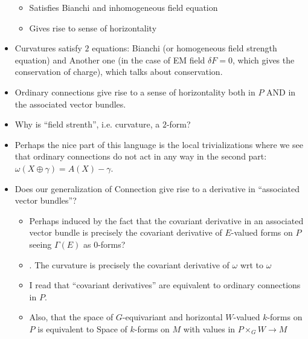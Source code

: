 \begin{itemize}
\begin{itemize}
        \item Satisfies Bianchi and inhomogeneous field equation
        
        \item Gives rise to sense of horizontality
    \end{itemize}
    
    \item Curvatures satisfy $2$ equations: Bianchi (or homogeneous field strength equation) and Another one (in the case of EM field $\delta F = 0$, which gives the conservation of charge), which talks about conservation. \label{BianchiandInhomogeneous}
    
    \item Ordinary connections give rise to a sense of horizontality both in $P$ AND in the associated vector bundles. \label{ordinaryHorizontality}
    
    \item Why is ``field strenth'', i.e. curvature, a $2$-form?
    
    
    
    \item Perhaps the nice part of this language is the local trivializations where we see that ordinary connections do not act in any way in the second part: $\omega(X \oplus \gamma) = A(X) - \gamma$.
    
    
    
    \item Does our generalization of Connection give rise to a  derivative in ``associated vector bundles''? \label{trulyCovariant}
    \begin{itemize}
        \item Perhaps induced by the fact that the covariant derivative in an associated vector bundle is precisely the covariant derivative of $E$-valued forms on $P$ seeing $\Gamma(E)$ as $0$-forms?
        
        \item {}. The curvature is precisely the covariant derivative of $\omega$ wrt to $\omega$
        
        \item I read that ``covariant derivatives'' are equivalent to ordinary connections in $P$.
        
        \item Also, that the space of $G$-equivariant and horizontal $W$-valued $k$-forms on $P$ is equivalent to Space of $k$-forms on $M$ with values in $P\times_G W \to M$
        

\end{itemize}
\end{itemize}
